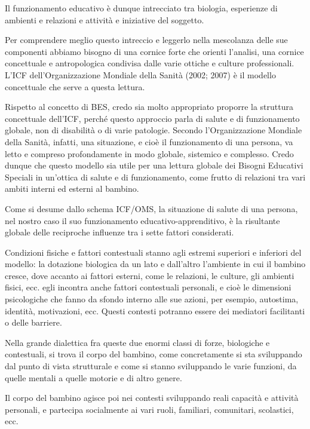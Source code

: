 Il funzionamento educativo è dunque intrecciato tra biologia, esperienze di ambienti e
relazioni e attività e iniziative del soggetto.

Per comprendere meglio questo intreccio e leggerlo nella mescolanza delle sue componenti
abbiamo bisogno di una cornice forte che orienti l'analisi, una cornice concettuale e antropologica
condivisa dalle varie ottiche e culture professionali. L'ICF dell'Organizzazione Mondiale della Sanità
(2002; 2007) è il modello concettuale che serve a questa lettura.

Rispetto al concetto di BES, credo sia molto appropriato proporre la struttura concettuale
dell'ICF, perché questo approccio parla di salute e di funzionamento globale, non di disabilità o di
varie patologie. Secondo l'Organizzazione Mondiale della Sanità, infatti, una situazione, e cioè il
funzionamento di una persona, va letto e compreso profondamente in modo globale, sistemico e
complesso. Credo dunque che questo modello sia utile per una lettura globale dei Bisogni Educativi
Speciali in un'ottica di salute e di funzionamento, come frutto di relazioni tra vari ambiti interni ed
esterni al bambino.

Come si desume dallo schema ICF/OMS, la situazione di salute di una persona, nel nostro caso
il suo funzionamento educativo-apprenditivo, è la risultante globale delle reciproche influenze tra i
sette fattori considerati.

Condizioni fisiche e fattori contestuali stanno agli estremi superiori e inferiori del modello: la
dotazione biologica da un lato e dall'altro l'ambiente in cui il bambino cresce, dove accanto ai
fattori esterni, come le relazioni, le culture, gli ambienti fisici, ecc. egli incontra anche fattori
contestuali personali, e cioè le dimensioni psicologiche che fanno da sfondo interno alle sue azioni,
per esempio, autostima, identità, motivazioni, ecc. Questi contesti potranno essere dei mediatori
facilitanti o delle barriere.

Nella grande dialettica fra queste due enormi classi di forze, biologiche e contestuali, si trova il
corpo del bambino, come concretamente si sta sviluppando dal punto di vista strutturale e come si
stanno sviluppando le varie funzioni, da quelle mentali a quelle motorie e di altro genere.

Il corpo del bambino agisce poi nei contesti sviluppando reali capacità e attività personali, e
partecipa socialmente ai vari ruoli, familiari, comunitari, scolastici, ecc.

